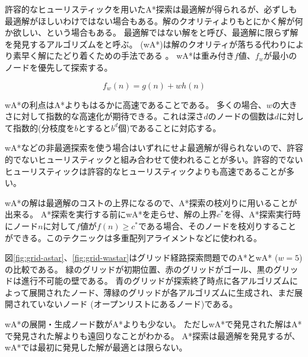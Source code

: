 許容的なヒューリスティックを用いたA*探索は最適解が得られるが、必ずしも最適解がほしいわけではない場合もある。解のクオリティよりもとにかく解が何か欲しい、という場合もある。
最適解ではない解をと呼び、最適解に限らず解を発見するアルゴリズムをと呼ぶ。%
 (wA*)は解のクオリティが落ちる代わりにより素早く解にたどり着くための手法である \cite{wilt2010comparison}。
wA*は重み付き$f$値、$f_w$が最小のノードを優先して探索する。

\begin{equation}
	f_w(n) = g(n) + w h(n)
\end{equation}



wA*の利点はA*よりもはるかに高速であることである。
多くの場合、$w$の大きさに対して指数的な高速化が期待できる。これは深さ$d$のノードの個数は$d$に対して指数的(分枝度を$b$とすると$b^d$個)であることに対応する。

wA*などの非最適探索を使う場合はいずれにせよ最適解が得られないので、許容的でないヒューリスティックと組み合わせて使われることが多い。許容的でないヒューリスティックは許容的なヒューリスティックよりも高速であることが多い。%

wA*の解は最適解のコストの上界になるので、A*探索の枝刈りに用いることが出来る。
A*探索を実行する前にwA*を走らせ、解の上界$c^*$を得、A*探索実行時にノード$n$に対して$f$値が$f(n) \geq c^*$である場合、そのノードを枝刈りすることができる。このテクニックは多重配列アライメントなどに使われる\cite{ikeda1999enhanced}。

図\ref{fig:grid-astar}、\ref{fig:grid-wastar}はグリッド経路探索問題でのA*とwA* ($w=5$)の比較である。
緑のグリッドが初期位置、赤のグリッドがゴール、黒のグリッドは進行不可能の壁である。
青のグリッドが探索終了時点に各アルゴリズムによって展開されたノード、薄緑のグリッドが各アルゴリズムに生成され、まだ展開されていないノード (オープンリストにあるノード)である。

wA*の展開・生成ノード数がA*よりも少ない。
ただしwA*で発見された解はA*で発見された解よりも遠回りなことがわかる。
A*探索は最適解を発見するが、wA*では最初に発見した解が最適とは限らない。

